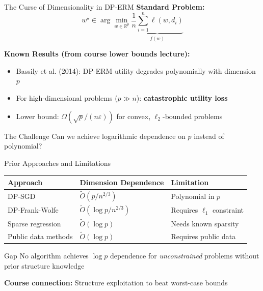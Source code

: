 \documentclass[10pt]{beamer}
\begin{document}
\begin{frame}{The Curse of Dimensionality in DP-ERM}
\textbf{Standard Problem:}
\[
w^\star \in \arg\min_{w \in \mathbb{R}^p} \underbrace{\frac{1}{n} \sum_{i=1}^n \ell(w, d_i)}_{f(w)}
\]

\vspace{1em}
\textbf{Known Results (from course lower bounds lecture):}
\begin{itemize}
\item Bassily et al. (2014): DP-ERM utility degrades \alert{polynomially} with dimension $p$
\item For high-dimensional problems ($p \gg n$): \textbf{catastrophic utility loss}
\item Lower bound: $\Omega(\sqrt{p}/(n\varepsilon))$ for convex, $\ell_2$-bounded problems
\end{itemize}

\vspace{1em}
\begin{block}{The Challenge}
Can we achieve \alert{logarithmic} dependence on $p$ instead of polynomial?
\end{block}
\end{frame}

\begin{frame}{Prior Approaches and Limitations}
\begin{table}
\footnotesize
\begin{tabular}{@{}lll@{}}
\toprule
\textbf{Approach} & \textbf{Dimension Dependence} & \textbf{Limitation} \\
\midrule
DP-SGD & $\tilde{O}(p / n^{2/3})$ & Polynomial in $p$ \\
DP-Frank-Wolfe & $\tilde{O}(\log p / n^{2/3})$ & Requires $\ell_1$ constraint \\
Sparse regression & $\tilde{O}(\log p)$ & Needs known sparsity \\
Public data methods & $\tilde{O}(\log p)$ & Requires public data \\
\bottomrule
\end{tabular}
\end{table}

\vspace{1em}
\begin{alertblock}{Gap}
No algorithm achieves $\log p$ dependence for \emph{unconstrained} problems without prior structure knowledge
\end{alertblock}

\vspace{0.5em}
\textbf{Course connection:} Structure exploitation to beat worst-case bounds
\end{frame}
\end{document}
